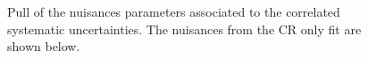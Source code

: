 \begin{figure}[tbhp]
    \caption{ Pull of the nuisances parameters associated to the correlated systematic uncertainties. The nuisances from the CR only fit are shown below. 
      \label{fig:nuisPull_Correlated}}
  \begin{center}
    
    \\
    \\
  \end{center}
\end{figure}

\clearpage


